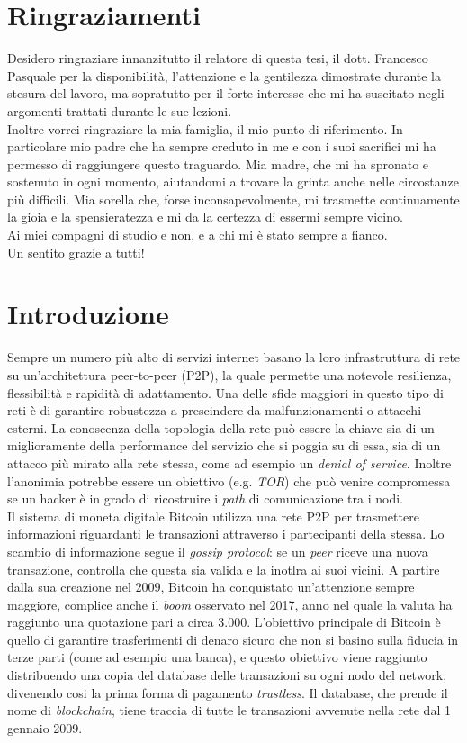 \chapter*{Ringraziamenti}
Desidero ringraziare innanzitutto il relatore di questa tesi, il dott. Francesco Pasquale per la disponibilit\`a, l'attenzione e la gentilezza dimostrate durante la stesura del lavoro, ma sopratutto per il forte interesse che mi ha suscitato negli argomenti trattati durante le sue lezioni.\\
Inoltre vorrei ringraziare la mia famiglia, il mio punto di riferimento. In particolare mio padre che ha sempre creduto in me e con i suoi sacrifici mi ha permesso di raggiungere questo traguardo. Mia madre, che mi ha spronato e sostenuto in ogni momento, aiutandomi a trovare la grinta anche nelle circostanze pi\`u difficili. Mia sorella che, forse inconsapevolmente, mi trasmette continuamente la gioia e la spensieratezza e mi da la certezza di essermi sempre vicino.\\
Ai miei compagni di studio e non, e a chi mi \`e stato sempre a fianco.\\
Un sentito grazie a tutti!


\chapter*{Introduzione}
Sempre un numero pi\`u alto di servizi internet basano la loro infrastruttura di rete su un'architettura peer-to-peer (P2P), la quale permette una notevole resilienza, flessibilit\`a e rapidit\`a di adattamento.
Una delle sfide maggiori in questo tipo di reti \`e di garantire robustezza a prescindere da malfunzionamenti o attacchi esterni. La conoscenza della topologia della rete pu\`o essere la chiave sia di un miglioramente della performance del servizio che si poggia su di essa, sia di un attacco pi\`u mirato alla rete stessa, come ad esempio un \textit{denial of service}.
Inoltre l'anonimia potrebbe essere un obiettivo (e.g. \textit{TOR}) che pu\`o venire compromessa se un hacker \`e in grado di ricostruire i \textit{path} di comunicazione tra i nodi.\\
Il sistema di moneta digitale Bitcoin utilizza una rete P2P per trasmettere informazioni riguardanti le transazioni attraverso i partecipanti della stessa. Lo scambio di informazione segue il \textit{gossip protocol}: se un \textit{peer} riceve una nuova transazione, controlla che questa sia valida e la inotlra ai suoi vicini.
A  partire  dalla  sua  creazione nel 2009, Bitcoin ha conquistato un'attenzione sempre maggiore, complice  anche  il \textit{boom} osservato nel 2017, anno nel quale la valuta ha raggiunto una quotazione pari a circa 3.000.
L'obiettivo principale di Bitcoin \`e quello di garantire trasferimenti di denaro sicuro che non si basino sulla fiducia in terze parti (come ad esempio una banca), e questo  obiettivo  viene  raggiunto  distribuendo  una  copia  del  database  delle transazioni su ogni nodo del network, divenendo cosi la prima forma di pagamento \textit{trustless}.
Il  database, che prende il nome di \textit{blockchain}, tiene traccia di tutte le  transazioni  avvenute  nella  rete  dal  1 gennaio 2009. 

